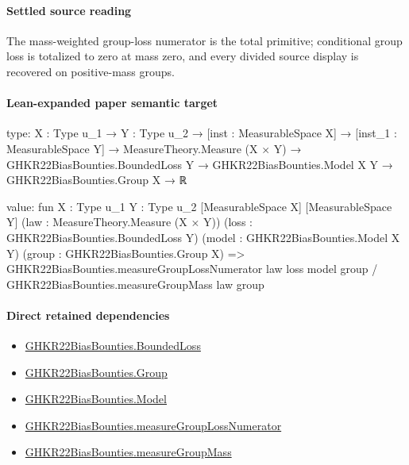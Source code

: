 \documentclass[10pt]{article}
\begin{document}
\paragraph{Settled source reading}
The mass-\allowbreak{}weighted group-\allowbreak{}loss numerator is the total primitive;\allowbreak{} conditional group loss is totalized to zero at mass zero, and every divided source display is recovered on positive-\allowbreak{}mass groups.\allowbreak{}

\paragraph{Lean-expanded paper semantic target}
\begin{ReviewVerbatim}
type:
{X : Type u_1} →
  {Y : Type u_2} →
    [inst : MeasurableSpace X] →
      [inst_1 : MeasurableSpace Y] →
        MeasureTheory.Measure (X × Y) →
          GHKR22BiasBounties.BoundedLoss Y → GHKR22BiasBounties.Model X Y → GHKR22BiasBounties.Group X → ℝ

value:
fun {X : Type u_1} {Y : Type u_2} [MeasurableSpace X] [MeasurableSpace Y] (law : MeasureTheory.Measure (X × Y))
    (loss : GHKR22BiasBounties.BoundedLoss Y) (model : GHKR22BiasBounties.Model X Y)
    (group : GHKR22BiasBounties.Group X) =>
  GHKR22BiasBounties.measureGroupLossNumerator law loss model group / GHKR22BiasBounties.measureGroupMass law group
\end{ReviewVerbatim}

\paragraph{Direct retained dependencies}
\begin{itemize}\raggedright
\item \hyperlink{paper-prerequisite-ef6c319b0770dad4}{GHKR22\allowbreak{}Bias\allowbreak{}Bounties.\allowbreak{}Bounded\allowbreak{}Loss}
\item \hyperlink{paper-prerequisite-cc7214115b27106f}{GHKR22\allowbreak{}Bias\allowbreak{}Bounties.\allowbreak{}Group}
\item \hyperlink{paper-prerequisite-333127605c12eba8}{GHKR22\allowbreak{}Bias\allowbreak{}Bounties.\allowbreak{}Model}
\item \hyperlink{paper-prerequisite-b4c6e5e84964ca52}{GHKR22\allowbreak{}Bias\allowbreak{}Bounties.\allowbreak{}measure\allowbreak{}Group\allowbreak{}Loss\allowbreak{}Numerator}
\item \hyperlink{paper-prerequisite-ac1a5a161f2dd3f6}{GHKR22\allowbreak{}Bias\allowbreak{}Bounties.\allowbreak{}measure\allowbreak{}Group\allowbreak{}Mass}
\end{itemize}
\end{document}
